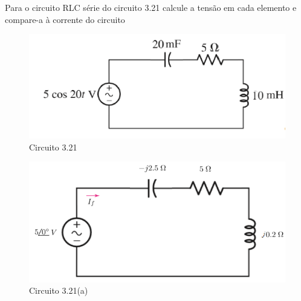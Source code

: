 \documentclass[
	12pt,				%
	oneside,			%
	a4paper,			%
	english,			%
	french,				%
	spanish,			%
	brazil				%
	]{abntex2}
\begin{document}
Para o circuito RLC série do circuito 3.21 calcule a tensão em cada elemento e compare-a à corrente do circuito
\begin{figure}[htb]
	\centering
	\includegraphics[scale=1]{3-21.PNG}
	\caption{Circuito 3.21}
\end{figure}

\begin{figure}[htb]
	\centering
	\includegraphics[scale=0.7]{3-21(a).PNG}
	\caption{Circuito 3.21(a)}
\end{figure}
\end{document}
